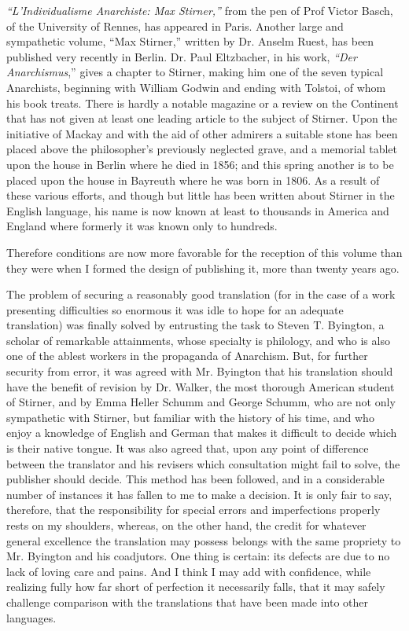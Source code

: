 \documentclass[12pt,a4paper]{book}
\begin{document}
\textit{``L'Individualisme Anarchiste: Max Stirner,''} from the pen of Prof 
Victor Basch, of the University of Rennes, has appeared in Paris. Another 
large and sympathetic volume, ``Max Stirner,'' written by Dr. Anselm Ruest, 
has been published very recently in Berlin. Dr. Paul Eltzbacher, in his work, 
\textit{``Der Anarchismus},'' gives a chapter to Stirner, making him one of 
the seven typical Anarchists, beginning with William Godwin and ending with 
Tolstoi, of whom his book treats. There is hardly a notable magazine or a 
review on the Continent that has not given at least one leading article to the 
subject of Stirner. Upon the initiative of Mackay and with the aid of other 
admirers a suitable stone has been placed above the philosopher's previously 
neglected grave, and a memorial tablet upon the house in Berlin where he died 
in 1856; and this spring another is to be placed upon the house in Bayreuth 
where he was born in 1806. As a result of these various efforts, and though 
but little has been written about Stirner in the English language, his name is 
now known at least to thousands in America and England where formerly it was 
known only to hundreds.

Therefore conditions are now more favorable for the reception of this volume 
than they were when I formed the design of publishing it, more than twenty 
years ago.

The problem of securing a reasonably good translation (for in the case of a 
work presenting difficulties so enormous it was idle to hope for an adequate 
translation) was finally solved by entrusting the task to Steven T. Byington, 
a scholar of remarkable attainments, whose specialty is philology, and who is 
also one of the ablest workers in the propaganda of Anarchism. But, for 
further security from error, it was agreed with Mr. Byington that his 
translation should have the benefit of revision by Dr. Walker, the most 
thorough American student of Stirner, and by Emma Heller Schumm and George 
Schumm, who are not only sympathetic with Stirner, but familiar with the 
history of his time, and who enjoy a knowledge of English and German that 
makes it difficult to decide which is their native tongue. It was also agreed 
that, upon any point of difference between the translator and his revisers 
which consultation might fail to solve, the publisher should decide. This 
method has been followed, and in a considerable number of instances it has 
fallen to me to make a decision. It is only fair to say, therefore, that the 
responsibility for special errors and imperfections properly rests on my 
shoulders, whereas, on the other hand, the credit for whatever general 
excellence the translation may possess belongs with the same propriety to Mr. 
Byington and his coadjutors. One thing is certain: its defects are due to no 
lack of loving care and pains. And I think I may add with confidence, while 
realizing fully how far short of perfection it necessarily falls, that it may 
safely challenge comparison with the translations that have been made into 
other languages.
\end{document}
